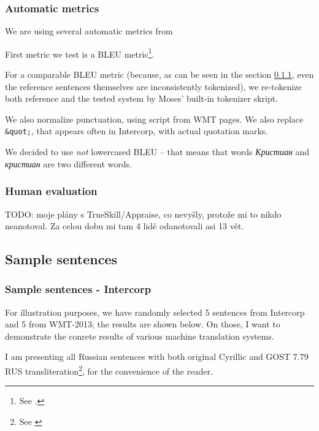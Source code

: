 \subsubsection{Automatic metrics}

We are using several automatic metrics from

First metric we test is a BLEU metric\footnote{See \cite{bleu}.}.

For a comparable BLEU metric (because, as can be seen in the section \ref{samples}, even the reference sentences themselves are inconsistently tokenized), we re-tokenize both reference and the tested system by Moses' built-in tokenizer skript.

We also normalize punctuation, using script from WMT pages. We also replace \texttt{\&quot;}, that appears often in Intercorp, with actual quotation marks.

We decided to use \emph{not} lowercased BLEU -- that means that words \emph{Кристиан} and \emph{кристиан} are two different words.

\subsubsection{Human evaluation}
TODO: moje plány s TrueSkill/Appraise, co nevyšly, protože mi to nikdo neanotoval. Za celou dobu mi tam 4 lidé odanotovali asi 13 vět.

\subsection{Sample sentences}

\subsubsection{Sample sentences - Intercorp}
\label{samples}

For illustration purposes, we have randomly selected 5 sentences from Intercorp and 5 from WMT-2013; the results are shown below. 
On those, I want to demonstrate the conrete results of various machine translation systems. 

I am presenting all Russian sentences with both original Cyrillic and GOST 7.79 RUS transliteration\footnote{See \cite{gost}}, for the convenience of the reader.



